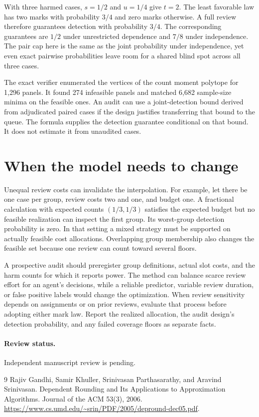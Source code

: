 \documentclass[11pt]{article}
\begin{document}
With three harmed cases, $s=1/2$ and $u=1/4$ give $t=2$. The
least favorable law has two marks with probability $3/4$ and
zero marks otherwise. A full review therefore guarantees detection
with probability $3/4$. The corresponding guarantees are $1/2$
under unrestricted dependence and $7/8$ under independence.
The pair cap here is the same as the joint probability under
independence, yet even exact pairwise probabilities leave room
for a shared blind spot across all three cases.

The exact verifier enumerated the vertices of the count moment
polytope for 1,296 panels. It found 274 infeasible panels and
matched 6,682 sample-size minima on the feasible ones. An audit
can use a joint-detection bound derived from adjudicated paired
cases if the design justifies transferring that bound to the queue.
The formula supplies the detection guarantee conditional on that
bound. It does not estimate it from unaudited cases.

\newpage
\section{When the model needs to change}
Unequal review costs can invalidate the interpolation. For
example, let there be one case per group, review costs two and
one, and budget one. A fractional calculation with expected
counts $(1/3,1/3)$ satisfies the expected budget but no feasible
realization can inspect the first group. Its worst-group
detection probability is zero. In that setting a mixed strategy
must be supported on actually feasible cost allocations.
Overlapping group membership also changes the feasible set
because one review can count toward several floors.

A prospective audit should preregister group definitions,
actual slot costs, and the harm counts for which it reports
power. The method can balance scarce review effort for an
agent's decisions, while a reliable predictor, variable review
duration, or false positive labels would change the optimization.
When review sensitivity depends on assignments or on prior
reviews, evaluate that process before adopting either mark law.
Report the realized allocation, the audit design's detection
probability, and any failed coverage floors as separate facts.

\paragraph{Review status.} Independent manuscript review is pending.

\begin{thebibliography}{9}
Rajiv Gandhi, Samir Khuller, Srinivasan Parthasarathy, and
Aravind Srinivasan. Dependent Rounding and Its Applications to
Approximation Algorithms. Journal of the ACM 53(3), 2006.
\url{https://www.cs.umd.edu/~srin/PDF/2005/depround-dec05.pdf}.
\end{thebibliography}
\end{document}
